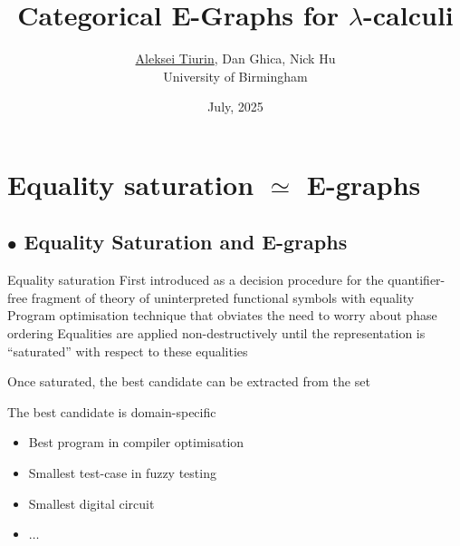 \documentclass[aspectratio=169]{beamer}
\title{Categorical E-Graphs for $\lambda$-calculi}
\date{July, 2025} %
\author[Aleksei Tiurin]{\underline{Aleksei Tiurin}, Dan Ghica, Nick Hu\\University of Birmingham}
\newcommand{\bsubsection}[1]{\subsection{$\bullet$ #1}}
\begin{document}
 


\renewcommand{\maketitle}{
}

\maketitle 


\section{Equality saturation $\simeq$ E-graphs}
\bsubsection{Equality Saturation and E-graphs}

\begin{frame}{Equality saturation}
\vfill
First introduced as a decision procedure for the quantifier-free fragment of theory of uninterpreted functional symbols with equality
\pause
\vfill
Program optimisation technique that obviates the need to worry about \alert{phase ordering}
\pause
\vfill
Equalities are applied non-destructively until the representation is \enquote{saturated} with respect to these equalities\par
\pause
\vfill
Once saturated, the \alert{best} candidate can be extracted from the set\par
\vfill
\pause
The \alert{best} candidate is domain-specific
\begin{itemize}
    \item Best program in compiler optimisation
    \item Smallest test-case in fuzzy testing
    \item Smallest digital circuit
    \item $\ldots$
\end{itemize}
\end{frame}
\end{document}
